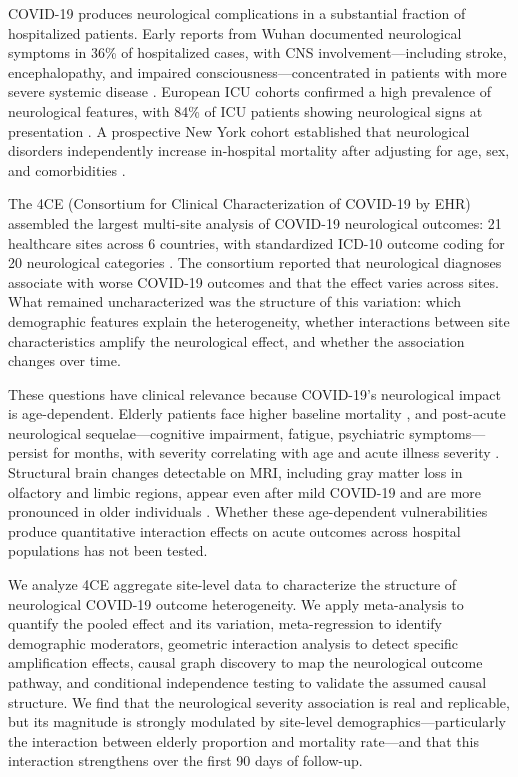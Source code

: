 \documentclass{article}
\begin{document}
COVID-19 produces neurological complications in a substantial fraction of hospitalized patients. Early reports from Wuhan documented neurological symptoms in 36\% of hospitalized cases, with CNS involvement---including stroke, encephalopathy, and impaired consciousness---concentrated in patients with more severe systemic disease \cite{mao2020neuro}. European ICU cohorts confirmed a high prevalence of neurological features, with 84\% of ICU patients showing neurological signs at presentation \cite{helms2020neuro}. A prospective New York cohort established that neurological disorders independently increase in-hospital mortality after adjusting for age, sex, and comorbidities \cite{frontera2021neuro}.

The 4CE (Consortium for Clinical Characterization of COVID-19 by EHR) assembled the largest multi-site analysis of COVID-19 neurological outcomes: 21 healthcare sites across 6 countries, with standardized ICD-10 outcome coding for 20 neurological categories \cite{four_ce_neuro2021}. The consortium reported that neurological diagnoses associate with worse COVID-19 outcomes and that the effect varies across sites. What remained uncharacterized was the structure of this variation: which demographic features explain the heterogeneity, whether interactions between site characteristics amplify the neurological effect, and whether the association changes over time.

These questions have clinical relevance because COVID-19's neurological impact is age-dependent. Elderly patients face higher baseline mortality \cite{williamson2020opensafely}, and post-acute neurological sequelae---cognitive impairment, fatigue, psychiatric symptoms---persist for months, with severity correlating with age and acute illness severity \cite{nalbandian2021pasc, taquet2021neuro}. Structural brain changes detectable on MRI, including gray matter loss in olfactory and limbic regions, appear even after mild COVID-19 and are more pronounced in older individuals \cite{douaud2022brain}. Whether these age-dependent vulnerabilities produce quantitative interaction effects on acute outcomes across hospital populations has not been tested.

We analyze 4CE aggregate site-level data to characterize the structure of neurological COVID-19 outcome heterogeneity. We apply meta-analysis to quantify the pooled effect and its variation, meta-regression to identify demographic moderators, geometric interaction analysis to detect specific amplification effects, causal graph discovery to map the neurological outcome pathway, and conditional independence testing to validate the assumed causal structure. We find that the neurological severity association is real and replicable, but its magnitude is strongly modulated by site-level demographics---particularly the interaction between elderly proportion and mortality rate---and that this interaction strengthens over the first 90 days of follow-up.
\end{document}
